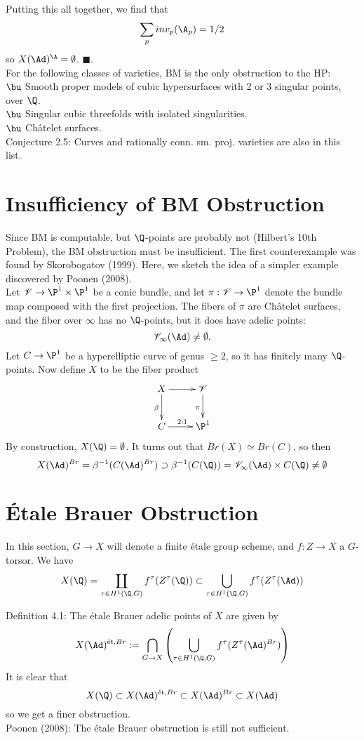 \documentclass[11pt]{amsart}
\numberwithin{equation}{section}
\numberwithin{subsection}{section}
\theoremstyle{definition}
\theoremstyle{remark}
\begin{document}
Putting this all together, we find that
$$\sum_p inv_p(\A_p) = 1/2$$
so $X(\Ad)^\A=\emptyset$.  $\blacksquare$.\\

For the following classes of varieties, BM is the only obstruction to the HP:\\

$\bu$ Smooth proper models of cubic hypersurfaces with 2 or 3 singular points, over $\Q$.\\
$\bu$ Singular cubic threefolds with isolated singularities.\\
$\bu$ Ch\^{a}telet surfaces.\\

Conjecture 2.5:  Curves and rationally conn. sm. proj. varieties are also in this list.

\section{Insufficiency of BM Obstruction}
Since BM is computable, but $\Q$-points are probably not (Hilbert's 10th Problem), the BM obstruction must be insufficient.  The first counterexample was found by Skorobogatov (1999).  Here, we sketch the idea of a simpler example discovered by Poonen (2008).\\

Let $\mathscr V\to \P^1\times \P^1$ be a conic bundle, and let $\pi:\mathscr V\to \P^1$ denote the bundle map composed with the first projection.  The fibers of $\pi$ are Ch\^{a}telet surfaces, and the fiber over $\infty$ has no $\Q$-points, but it does have adelic points:
$$\mathscr V_{\infty}(\Ad)\neq\emptyset.$$
Let $C\to \P^1$ be a hyperelliptic curve of genus $\geq 2$, so it has finitely many $\Q$-points.  Now define $X$ to be the fiber product
$$\xymatrix{
X \ar[r]\ar[d]_\beta & \mathscr V \ar[d]_\pi\\
C \ar[r]^{2:1} & \P^1
}$$
By construction, $X(\Q)=\emptyset$.  It turns out that $Br(X)\simeq Br(C)$, so then
$$X(\Ad)^{Br} = \beta^{-1}(C(\Ad)^{Br})\supset \beta^{-1}(C(\Q)) = \mathscr V_\infty(\Ad)\times C(\Q)\neq \emptyset$$

\section{\'{E}tale Brauer Obstruction}

In this section, $G\to X$ will denote a finite \'{e}tale group scheme, and $f:Z\to X$ a $G$-torsor.  We have
$$X(\Q) = \coprod_{\tau\in H^1(\Q,G)} f^\tau(Z^\tau(\Q)) \subset \bigcup_{\tau\in H^1(\Q,G)} f^\tau(Z^\tau(\Ad))$$

Definition 4.1:  The \'{e}tale Brauer adelic points of $X$ are given by
$$X(\Ad)^{\text{\'{e}t},Br} := \bigcap_{G\to X} \left(  \bigcup_{\tau\in H^1(\Q,G)} f^\tau(Z^\tau(\Ad)^{Br}) \right)$$
It is clear that
$$X(\Q)\subset X(\Ad)^{\text{\'{e}t},Br} \subset X(\Ad)^{Br} \subset X(\Ad)$$
so we get a finer obstruction.\\

Poonen (2008):  The \'{e}tale Brauer obstruction is still not sufficient.
\end{document}
